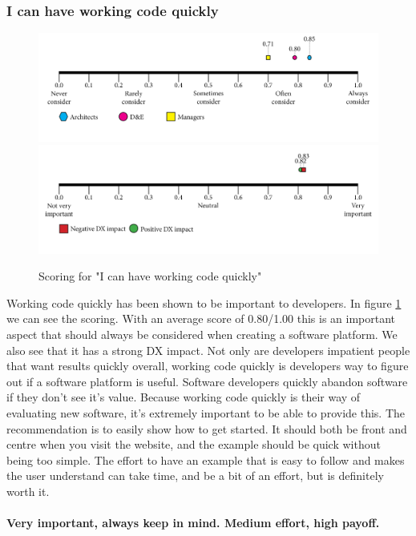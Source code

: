 \documentclass{article}
\begin{document}
\subsubsection{I can have working code quickly}
\begin{figure}[H]
\centering
\includegraphics[width=\linewidth]{scorelines/aspect2.png}
\includegraphics[width=\linewidth]{dxscorelines/dxaspect2.png}
\caption{Scoring for "I can have working code quickly"}
\label{fig:aspect2}
\end{figure}
Working code quickly has been shown to be important to developers. In figure \ref{fig:aspect2} we can see the scoring. With an average score of 0.80/1.00 this is an important aspect that should always be considered when creating a software platform. We also see that it has a strong DX impact. Not only are developers impatient people that want results quickly overall, working code quickly is developers way to figure out if a software platform is useful. Software developers quickly abandon software if they don't see it's value. Because working code quickly is their way of evaluating new software, it's extremely important to be able to provide this. The recommendation is to easily show how to get started. It should both be front and centre when you visit the website, and the example should be quick without being too simple. The effort to have an example that is easy to follow  and makes the user understand can take time, and be a bit of an effort, but is definitely worth it.\\ \\
\textbf{Very important, always keep in mind. Medium effort, high payoff.}
\end{document}
